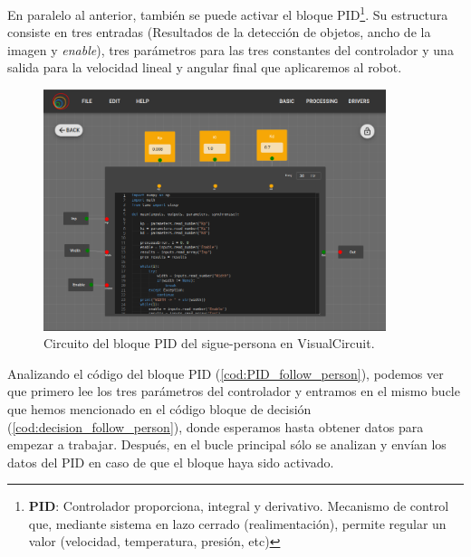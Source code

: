 En paralelo al anterior, también se puede activar el bloque PID\footnote{
    \textbf{PID}: Controlador proporciona, integral y derivativo.
        Mecanismo de control que, mediante sistema en lazo cerrado (realimentación), permite regular
        un valor (velocidad, temperatura, presión, etc)}.
Su estructura consiste en tres entradas (Resultados de la detección de objetos, ancho de la imagen y \textit{enable}), tres parámetros para las
tres constantes del controlador y una salida para la velocidad lineal y angular final que aplicaremos al robot.

\begin{figure} [H]
    \begin{center}
        \includegraphics[width=10cm]{figs/c5/PID_follow_person.png}
    \end{center}
    \caption[Circuito del bloque PID sigue-persona]{Circuito del bloque PID del sigue-persona en VisualCircuit.}
    \label{fig:PID_follow_person}
\end{figure}

Analizando el código del bloque PID (\ref{cod:PID_follow_person}), podemos ver que primero lee los tres parámetros del controlador y entramos en el
mismo bucle que hemos mencionado en el código bloque de decisión (\ref{cod:decision_follow_person}), donde esperamos hasta obtener datos para
empezar a trabajar. Después, en el bucle principal sólo se analizan y envían los datos del PID en caso de que el bloque haya sido activado.\\

